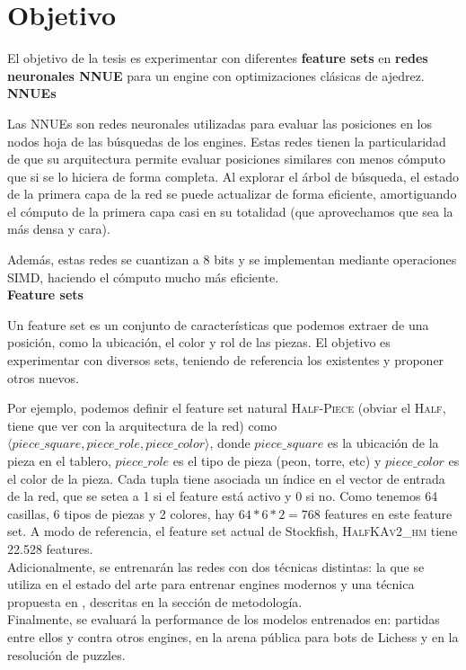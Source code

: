 \newpage
\section*{Objetivo}

El objetivo de la tesis es experimentar con diferentes \textbf{feature sets} en \textbf{redes neuronales NNUE} para un engine con optimizaciones clásicas de ajedrez. \\

\textbf{NNUEs}

Las NNUEs son redes neuronales utilizadas para evaluar las posiciones en los nodos hoja de las búsquedas de los engines. Estas redes tienen la particularidad de que su arquitectura permite evaluar posiciones similares con menos cómputo que si se lo hiciera de forma completa. Al explorar el árbol de búsqueda, el estado de la primera capa de la red se puede actualizar de forma eficiente, amortiguando el cómputo de la primera capa casi en su totalidad (que aprovechamos que sea la más densa y cara).

Además, estas redes se cuantizan a 8 bits y se implementan mediante operaciones SIMD, haciendo el cómputo mucho más eficiente. \\

\textbf{Feature sets}

Un feature set es un conjunto de características que podemos extraer de una posición, como la ubicación, el color y rol de las piezas. El objetivo es experimentar con diversos sets, teniendo de referencia los existentes y proponer otros nuevos.

Por ejemplo, podemos definir el feature set natural \textsc{Half-Piece} (obviar el \textsc{Half}, tiene que ver con la arquitectura de la red) como $\langle piece\_square, piece\_role, piece\_color \rangle$, donde $piece\_square$ es la ubicación de la pieza en el tablero, $piece\_role$ es el tipo de pieza (peon, torre, etc) y $piece\_color$ es el color de la pieza. Cada tupla tiene asociada un índice en el vector de entrada de la red, que se setea a 1 si el feature está activo y 0 si no. Como tenemos 64 casillas, 6 tipos de piezas y 2 colores, hay $64*6*2=768$ features en este feature set.
A modo de referencia, el feature set actual de Stockfish, \textsc{HalfKAv2\_hm} tiene 22.528 features. \\

Adicionalmente, se entrenarán las redes con dos técnicas distintas: la que se utiliza en el estado del arte para entrenar engines modernos y una técnica propuesta en \cite{dlchess:2014}, descritas en la sección de metodología. \\

Finalmente, se evaluará la performance de los modelos entrenados en: partidas entre ellos y contra otros engines, en la arena pública para bots de Lichess y en la resolución de puzzles.
